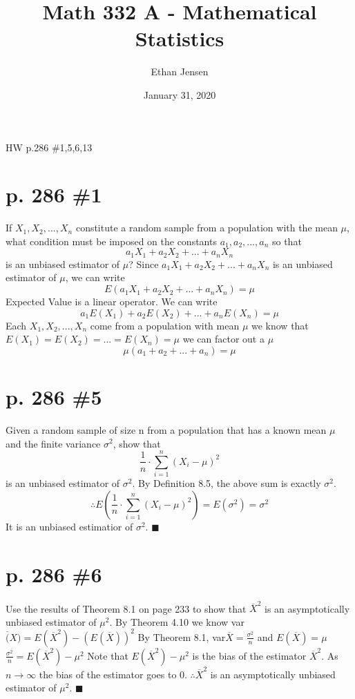 \documentclass[12pt]{article}
\title{Math 332 A - Mathematical Statistics}
\author{Ethan Jensen}
\date{January 31, 2020}
\begin{document}
	\maketitle HW p.286 \#1,5,6,13
	\section[20pt]{p. 286 \#1}
	If \(X_1,X_2,...,X_n\) constitute a random sample from a population with the mean \(\mu\), what condition must be imposed on the constants \(a_1,a_2,...,a_n\) so that
	\[a_1X_1 + a_2X_2 + ... + a_nX_n\] is an unbiased estimator of \(\mu\)? \newline \newline
	Since \(a_1X_1 + a_2X_2 + ... + a_nX_n\) is an unbiased estimator of \(\mu\), we can write
	\[E(a_1X_1 + a_2X_2 + ... + a_nX_n) = \mu\]
	Expected Value is a linear operator. We can write
	\[a_1E(X_1)+ a_2E(X_2)+...+a_nE(X_n) = \mu\]
	Each \(X_1,X_2,...,X_n\) come from a population with mean \(\mu\) we know that \(E(X_1)=E(X_2)=...=E(X_n)=\mu\) we can factor out a \(\mu\)
	\[\mu(a_1+a_2+...+a_n) = \mu\]
	\newpage
	\section[20pt]{p. 286 \#5}
	Given a random sample of size n from a population that has a known mean \(\mu\) and the finite variance \(\sigma^2\), show that \[\frac{1}{n} \cdot \sum_{i=1}^n(X_i-\mu)^2\] is an unbiased estimator of \(\sigma^2\). \newline \newline
	By Definition 8.5, the above sum is exactly \(\sigma^2\).
	\[\therefore E\left(\frac{1}{n} \cdot \sum_{i=1}^n(X_i-\mu)^2\right) = E(\sigma^2) = \sigma^2\]
	It is an unbiased estimatior of \(\sigma^2\). \newline
	\(\blacksquare\)
	\newpage
	\section[20pt]{p. 286 \#6}
	Use the results of Theorem 8.1 on page 233 to show that \(\overline{X}^2\) is an asymptotically unbiased estimator of \(\mu^2\). \newline \newline
	By Theorem 4.10 we know \newline
	var\(\overline(X) = E(\overline{X}^2) - (E(\overline{X}))^2\)
	\newline \newline
	By Theorem 8.1, var\(\overline{X}=\frac{\sigma^2}{n}\) and \(E(\overline{X})=\mu\)
	\newline
	\(\frac{\sigma^2}{n} = E(\overline{X}^2) - \mu^2\)
	\newline \newline
	Note that \(E(\overline{X}^2) - \mu^2\) is the bias of the estimator \(\overline{X}^2\). \newline
	As \(n \rightarrow \infty\) the bias of the estimator goes to 0. \newline
	\(\therefore \overline{X}^2\) is an asymptotically unbiased estimator of \(\mu^2\). \newline
	\(\blacksquare\)
	\newpage
\end{document}
